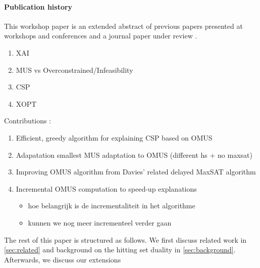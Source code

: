 {{\paragraph*{Publication history} This workshop paper is an extended abstract of previous papers presented at workshops and conferences \cite{claesuser,DBLP:conf/bnaic/ClaesBCGG19,ecai/BogaertsGCG20} and a journal paper under review \cite{bogaerts2020framework}.
}

\begin{enumerate}
    \item XAI
    \item MUS vs Overconstrained/Infeasibility
    \item CSP
    \item XOPT
\end{enumerate}

Contributions : 
\begin{enumerate}
    \item Efficient, greedy algorithm for explaining CSP based on OMUS 
    \item Adapatation smallest MUS adaptation to OMUS (different hs + no maxsat) 
    \item Improving OMUS algorithm from Davies' related delayed MaxSAT algorithm 
    \item Incremental OMUS computation to speed-up explanations
    \begin{itemize}
        \item hoe belangrijk is de incrementaliteit in het algorithme
        \item kunnen  we nog meer incrementeel verder gaan
    \end{itemize}
\end{enumerate}
}


The rest of this paper is structured as follows. We first discuss related work in \cref{sec:related} and background on the hitting set duality in \cref{sec:background}. Afterwards, we discuss our extensions

